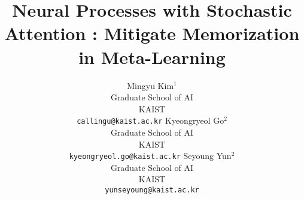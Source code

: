 \documentclass{article}
\title{Neural Processes with Stochastic Attention : Mitigate Memorization in Meta-Learning}
\author{
Mingyu Kim$^1$ \\
Graduate School of AI \\
KAIST \\
\texttt{callingu@kaist.ac.kr}
\And
Kyeongryeol Go$^2$ \\
Graduate School of AI \\
KAIST\\
\texttt{kyeongryeol.go@kaist.ac.kr}
\And
Seyoung Yun$^2$ \\
Graduate School of AI \\
KAIST\\
\texttt{yunseyoung@kaist.ac.kr}}
\begin{document}
\maketitle

\begin{abstract}
  
\end{abstract}











\end{document}
